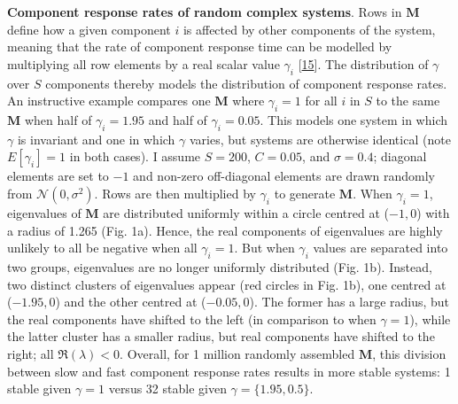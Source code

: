 \documentclass[]{article}
\begin{document}
\textbf{Component response rates of random complex systems}. Rows in
\(\mathbf{M}\) define how a given component \(i\) is affected by other
components of the system, meaning that the rate of component response
time can be modelled by multiplying all row elements by a real scalar
value \(\gamma_{i}\) {[}\protect\hyperlink{ref-Patel2018}{15}{]}. The
distribution of \(\gamma\) over \(S\) components thereby models the
distribution of component response rates. An instructive example
compares one \(\mathbf{M}\) where \(\gamma_{i} = 1\) for all \(i\) in
\(S\) to the same \(\mathbf{M}\) when half of \(\gamma_{i} = 1.95\) and
half of \(\gamma_{i} = 0.05\). This models one system in which
\(\gamma\) is invariant and one in which \(\gamma\) varies, but systems
are otherwise identical (note \(E[\gamma_{i}] = 1\) in both cases). I
assume \(S = 200\), \(C = 0.05\), and \(\sigma = 0.4\); diagonal
elements are set to \(-1\) and non-zero off-diagonal elements are drawn
randomly from \(\mathcal{N}(0, \sigma^{2})\). Rows are then multiplied
by \(\gamma_{i}\) to generate \(\mathbf{M}\). When \(\gamma_{i} = 1\),
eigenvalues of \(\mathbf{M}\) are distributed uniformly within a circle
centred at (\(-1, 0\)) with a radius of 1.265 (Fig. 1a). Hence, the real
components of eigenvalues are highly unlikely to all be negative when
all \(\gamma_{i} = 1\). But when \(\gamma_{i}\) values are separated
into two groups, eigenvalues are no longer uniformly distributed (Fig.
1b). Instead, two distinct clusters of eigenvalues appear (red circles
in Fig. 1b), one centred at (\(-1.95, 0\)) and the other centred at
(\(-0.05, 0\)). The former has a large radius, but the real components
have shifted to the left (in comparison to when \(\gamma = 1\)), while
the latter cluster has a smaller radius, but real components have
shifted to the right; all \(\Re({\lambda}) < 0\). Overall, for 1 million
randomly assembled \(\mathbf{M}\), this division between slow and fast
component response rates results in more stable systems: 1 stable given
\(\gamma = 1\) versus 32 stable given \(\gamma = \{1.95, 0.5\}\).
\end{document}
